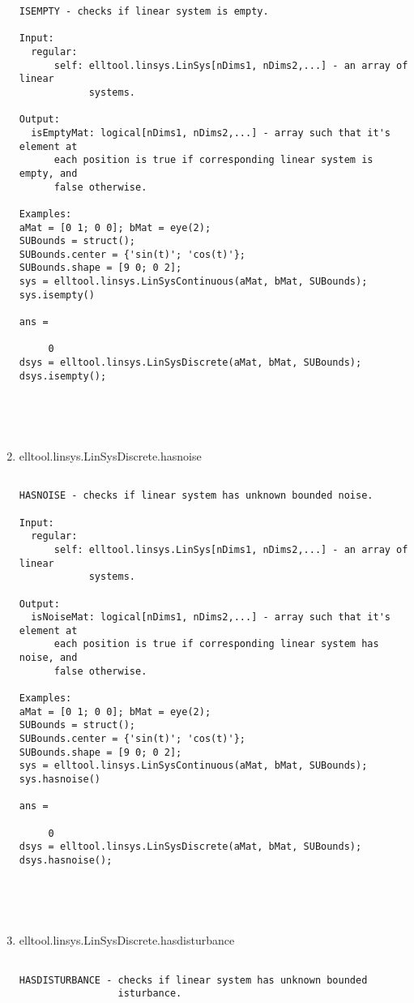 \begin{enumerate}
\begin{lstlisting}
ISEMPTY - checks if linear system is empty.

Input:
  regular:
      self: elltool.linsys.LinSys[nDims1, nDims2,...] - an array of linear
            systems.

Output:
  isEmptyMat: logical[nDims1, nDims2,...] - array such that it's element at
      each position is true if corresponding linear system is empty, and
      false otherwise.

Examples:
aMat = [0 1; 0 0]; bMat = eye(2);
SUBounds = struct();
SUBounds.center = {'sin(t)'; 'cos(t)'};
SUBounds.shape = [9 0; 0 2];
sys = elltool.linsys.LinSysContinuous(aMat, bMat, SUBounds);
sys.isempty()

ans =

     0
dsys = elltool.linsys.LinSysDiscrete(aMat, bMat, SUBounds);
dsys.isempty();





\end{lstlisting}
\fontfamily{\familydefault}
\selectfont
\item {elltool.linsys.LinSysDiscrete.hasnoise}
\selectfont
\begin{lstlisting}

HASNOISE - checks if linear system has unknown bounded noise.

Input:
  regular:
      self: elltool.linsys.LinSys[nDims1, nDims2,...] - an array of linear
            systems.

Output:
  isNoiseMat: logical[nDims1, nDims2,...] - array such that it's element at
      each position is true if corresponding linear system has noise, and
      false otherwise.

Examples:
aMat = [0 1; 0 0]; bMat = eye(2);
SUBounds = struct();
SUBounds.center = {'sin(t)'; 'cos(t)'};
SUBounds.shape = [9 0; 0 2];
sys = elltool.linsys.LinSysContinuous(aMat, bMat, SUBounds);
sys.hasnoise()

ans =

     0
dsys = elltool.linsys.LinSysDiscrete(aMat, bMat, SUBounds);
dsys.hasnoise();





\end{lstlisting}
\fontfamily{\familydefault}
\selectfont
\item {elltool.linsys.LinSysDiscrete.hasdisturbance}
\selectfont
\begin{lstlisting}

HASDISTURBANCE - checks if linear system has unknown bounded
                 isturbance.


\end{lstlisting}
\end{enumerate}
